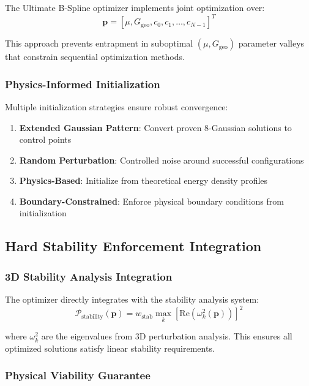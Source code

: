 \documentclass[11pt]{article}
\begin{document}
The Ultimate B-Spline optimizer implements joint optimization over:
\begin{equation}
\mathbf{p} = [\mu, G_{\text{geo}}, c_0, c_1, \ldots, c_{N-1}]^T
\end{equation}

This approach prevents entrapment in suboptimal $(\mu, G_{\text{geo}})$ parameter valleys that constrain sequential optimization methods.

\subsubsection{Physics-Informed Initialization}

Multiple initialization strategies ensure robust convergence:
\begin{enumerate}
\item \textbf{Extended Gaussian Pattern}: Convert proven 8-Gaussian solutions to control points
\item \textbf{Random Perturbation}: Controlled noise around successful configurations
\item \textbf{Physics-Based}: Initialize from theoretical energy density profiles
\item \textbf{Boundary-Constrained}: Enforce physical boundary conditions from initialization
\end{enumerate}

\subsection{Hard Stability Enforcement Integration}

\subsubsection{3D Stability Analysis Integration}

The optimizer directly integrates with the stability analysis system:
\begin{equation}
\mathcal{P}_{\text{stability}}(\mathbf{p}) = w_{\text{stab}} \max_{k}[\text{Re}(\omega_k^2(\mathbf{p}))]^2
\end{equation}

where $\omega_k^2$ are the eigenvalues from 3D perturbation analysis. This ensures all optimized solutions satisfy linear stability requirements.

\subsubsection{Physical Viability Guarantee}
\end{document}
